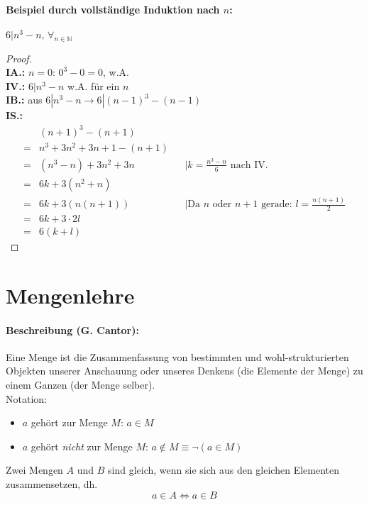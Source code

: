\paragraph{Beispiel durch vollständige Induktion nach $n$:}$6|n^3 -n,\, \forall_{n\in\mathbb{N}}$\\
\begin{proof}
\ \\
\textbf{IA.:} $n=0$: $0^3-0=0$, w.A. \\
\textbf{IV.:} $6|n^3 -n$ w.A. für ein $n$ \\
\textbf{IB.:} aus $6|n^3 -n \rightarrow 6|(n-1)^3 -(n-1)$ \\
\textbf{IS.:}
\begin{align*}
&(n+1)^3 - (n+1) \\
= &n^3+3n^2+3n+1-(n+1) \\
= &(n^3-n) + 3n^2 + 3n && |k=\frac{n^3-n}{6} \text{ nach IV.}\\
= &6k +3(n^2+n) \\
= &6k + 3(n(n+1)) && |\text{Da $n$ oder $n+1$ gerade: } l=\frac{n(n+1)}{2} \\
= &6k+3\cdot 2l \\
= &6(k+l)
\end{align*}
\end{proof}

\section{Mengenlehre}
\paragraph{Beschreibung (G. Cantor):}\glqq Eine Menge ist die Zusammenfassung von bestimmten und wohl-strukturierten Objekten unserer Anschauung oder unseres Denkens
(die Elemente der Menge) zu einem Ganzen (der Menge selber).\grqq\\
Notation:
\begin{itemize}
\item $a$ gehört zur Menge $M$: $a\in M$
\item $a$ gehört \emph{nicht} zur Menge $M$: $a\notin M\equiv \neg(a\in M)$
\end{itemize}
Zwei Mengen $A$ und $B$ sind gleich, wenn sie sich aus den gleichen Elementen zusammensetzen, dh.
\[
a\in A \Leftrightarrow a\in B
\]
